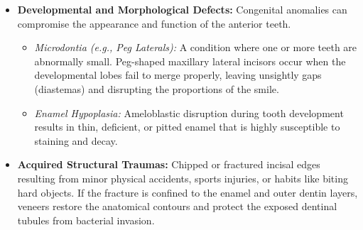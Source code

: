 \begin{itemize}
\begin{itemize}
        \item \textit{Abrasion:} Wear caused by foreign objects, such as aggressive toothbrushing with highly abrasive dentifrices, resulting in V-shaped notches near the cervical margins of the teeth.
    \end{itemize}
    \item \textbf{Developmental and Morphological Defects:} Congenital anomalies can compromise the appearance and function of the anterior teeth.
    \begin{itemize}
        \item \textit{Microdontia (e.g., Peg Laterals):} A condition where one or more teeth are abnormally small. Peg-shaped maxillary lateral incisors occur when the developmental lobes fail to merge properly, leaving unsightly gaps (diastemas) and disrupting the proportions of the smile.
        \item \textit{Enamel Hypoplasia:} Ameloblastic disruption during tooth development results in thin, deficient, or pitted enamel that is highly susceptible to staining and decay.
    \end{itemize}
    \item \textbf{Acquired Structural Traumas:} Chipped or fractured incisal edges resulting from minor physical accidents, sports injuries, or habits like biting hard objects. If the fracture is confined to the enamel and outer dentin layers, veneers restore the anatomical contours and protect the exposed dentinal tubules from bacterial invasion.
\end{itemize}

